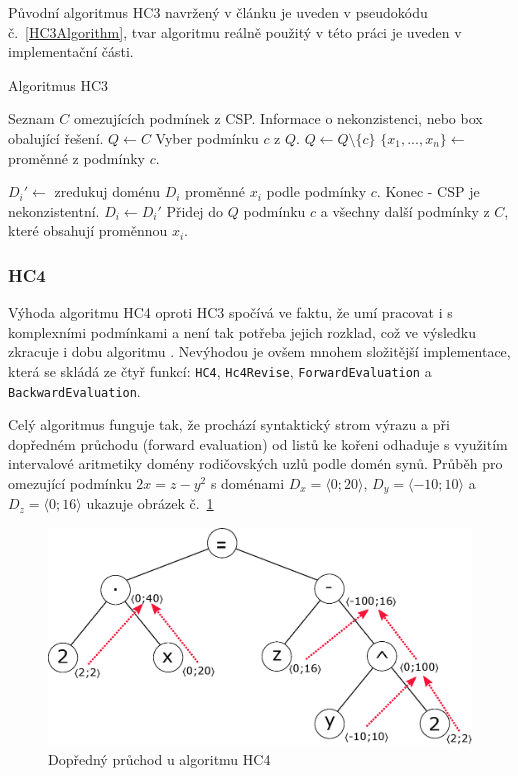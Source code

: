 Původní algoritmus HC3 navržený v článku \cite{Benhamou97applyinginterval} je uveden v pseudokódu č.~\ref{HC3Algorithm}, tvar algoritmu reálně použitý v této práci je uveden v implementační části.

\begin{algorithm}
\caption{Algoritmus HC3}
\label{HC3Algorithm}
\begin{algorithmic}[1]
\Require Seznam $C$ omezujících podmínek z CSP.
\Ensure Informace o nekonzistenci, nebo box obalující řešení.
\State $Q \gets C$
\State Vyber podmínku $c$ z $Q$.
\State $Q \gets Q \setminus \{ c \}$
\State $\{ x_1, ..., x_n\} \gets $ proměnné z podmínky $c$.

\State $D_i' \gets $ zredukuj doménu $D_i$ proměnné $x_i$ podle podmínky $c$.
\State Konec - CSP je nekonzistentní.
\EndIf
{}
\State $D_i \gets D_i'$
\State Přidej do $Q$ podmínku $c$ a všechny další podmínky z $C$, které obsahují proměnnou $x_i$.
\EndIf
\EndFor
\EndWhile
\EndProcedure
\end{algorithmic}
\end{algorithm}


\subsubsection{HC4}
Výhoda algoritmu HC4 oproti HC3 spočívá ve faktu, že umí pracovat i s komplexními podmínkami a není tak potřeba jejich rozklad, což ve výsledku zkracuje i dobu algoritmu \cite{Benhamou99revisinghull}. Nevýhodou je ovšem mnohem složitější implementace, která se skládá ze čtyř funkcí: \verb|HC4|, \verb|Hc4Revise|, \verb|ForwardEvaluation| a \verb|BackwardEvaluation|.

Celý algoritmus funguje tak, že prochází syntaktický strom výrazu a při dopředném průchodu (forward evaluation) od listů ke kořeni odhaduje s využitím intervalové aritmetiky domény rodičovských uzlů podle domén synů. Průběh pro omezující podmínku $2x = z - y^2$ s doménami $D_x = \langle 0;20\rangle$, $D_y = \langle -10;10\rangle$ a $D_z = \langle 0;16\rangle$ ukazuje obrázek č.~\ref{img:forwardPropag}

\begin{figure}
\label{img:forwardPropag}
\centering
\includegraphics[scale=.65]{img/forwardPropag.eps}
\caption{Dopředný průchod u algoritmu HC4}
\end{figure}

